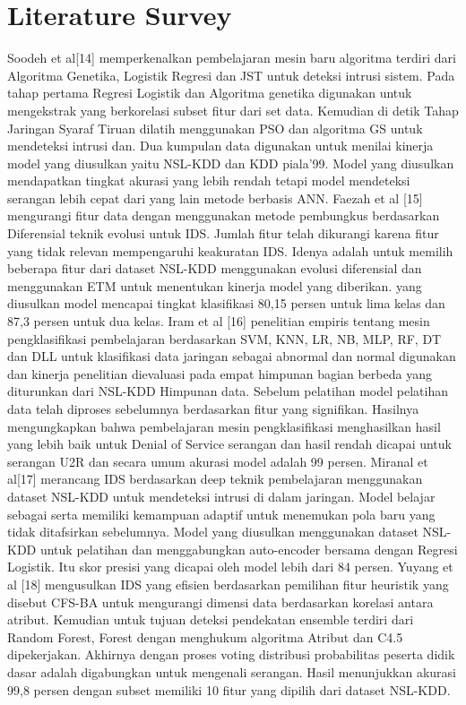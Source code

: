 \documentclass[conference]{IEEEtran}
\begin{document}
\section{Literature Survey}
Soodeh et al[14]\cite{hosseini2020new} memperkenalkan pembelajaran mesin baru algoritma terdiri dari Algoritma Genetika, Logistik Regresi dan JST untuk deteksi intrusi sistem. Pada tahap pertama Regresi Logistik dan Algoritma genetika digunakan untuk mengekstrak yang berkorelasi subset fitur dari set data. Kemudian di detik Tahap Jaringan Syaraf Tiruan dilatih menggunakan PSO dan algoritma GS untuk mendeteksi intrusi dan. Dua kumpulan data digunakan untuk menilai kinerja model yang diusulkan yaitu NSL-KDD dan KDD piala'99. Model yang diusulkan mendapatkan tingkat akurasi yang lebih rendah tetapi model mendeteksi serangan lebih cepat dari yang lain metode berbasis ANN. Faezah et al [15]\cite{almasoudy2020differential} mengurangi fitur data dengan menggunakan metode pembungkus berdasarkan Diferensial teknik evolusi untuk IDS. Jumlah fitur telah dikurangi karena fitur yang tidak relevan mempengaruhi keakuratan IDS. Idenya adalah untuk memilih beberapa fitur dari dataset NSL-KDD menggunakan evolusi diferensial dan menggunakan ETM untuk menentukan kinerja model yang diberikan. yang diusulkan model mencapai tingkat klasifikasi 80,15 persen untuk lima kelas dan 87,3 persen  untuk dua kelas. Iram et al [16]\cite{abrar2020machine} penelitian empiris tentang mesin pengklasifikasi pembelajaran berdasarkan SVM, KNN, LR, NB, MLP, RF, DT dan DLL untuk klasifikasi data jaringan sebagai abnormal dan normal digunakan dan kinerja penelitian dievaluasi pada empat himpunan bagian berbeda yang diturunkan dari NSL-KDD Himpunan data. Sebelum pelatihan model pelatihan data telah diproses sebelumnya berdasarkan fitur yang signifikan. Hasilnya mengungkapkan bahwa pembelajaran mesin pengklasifikasi menghasilkan hasil yang lebih baik untuk Denial of Service serangan dan hasil rendah dicapai untuk serangan U2R dan secara umum akurasi model adalah 99 persen. Miranal et al[17]\cite{gurung2019deep} merancang IDS berdasarkan deep teknik pembelajaran menggunakan dataset NSL-KDD untuk mendeteksi intrusi di dalam jaringan. Model belajar sebagai serta memiliki kemampuan adaptif untuk menemukan pola baru yang tidak ditafsirkan sebelumnya. Model yang diusulkan menggunakan dataset NSL-KDD untuk pelatihan dan menggabungkan auto-encoder bersama dengan Regresi Logistik. Itu skor presisi yang dicapai oleh model lebih dari 84 persen. Yuyang et al [18]\cite{zhou174building} mengusulkan IDS yang efisien berdasarkan pemilihan fitur heuristik yang disebut CFS-BA untuk mengurangi dimensi data berdasarkan korelasi antara atribut. Kemudian untuk tujuan deteksi pendekatan ensemble terdiri dari Random Forest, Forest dengan menghukum algoritma Atribut dan C4.5 dipekerjakan. Akhirnya dengan proses voting distribusi probabilitas peserta didik dasar adalah digabungkan untuk mengenali serangan. Hasil menunjukkan akurasi 99,8 persen dengan subset memiliki 10 fitur yang dipilih dari dataset NSL-KDD.
\end{document}
